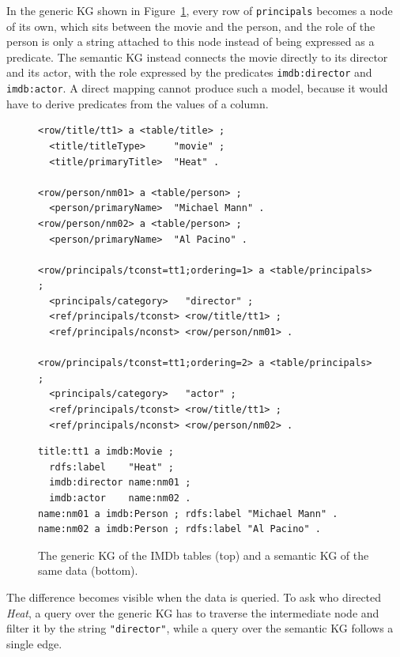 In the generic KG shown in Figure~\ref{fig:generic-imdb-eg}, every row of \texttt{principals} becomes a node of its own, which sits between the movie and the person, and the role of the person is only a string attached to this node instead of being expressed as a predicate. The semantic KG instead connects the movie directly to its director and its actor, with the role expressed by the predicates \texttt{imdb:director} and \texttt{imdb:actor}. A direct mapping cannot produce such a model, because it would have to derive predicates from the values of a column.
\begin{figure}[!htbp]
  \begin{minipage}{0.95\textwidth}
\begin{lstlisting}[language=Turtle, basicstyle=\ttfamily\scriptsize, columns=fixed, xleftmargin=0pt]
<row/title/tt1> a <table/title> ;
  <title/titleType>     "movie" ;
  <title/primaryTitle>  "Heat" .

<row/person/nm01> a <table/person> ;
  <person/primaryName>  "Michael Mann" .
<row/person/nm02> a <table/person> ;
  <person/primaryName>  "Al Pacino" .

<row/principals/tconst=tt1;ordering=1> a <table/principals> ;
  <principals/category>   "director" ;
  <ref/principals/tconst> <row/title/tt1> ;
  <ref/principals/nconst> <row/person/nm01> .

<row/principals/tconst=tt1;ordering=2> a <table/principals> ;
  <principals/category>   "actor" ;
  <ref/principals/tconst> <row/title/tt1> ;
  <ref/principals/nconst> <row/person/nm02> .

\end{lstlisting}

  \vspace{0.3em
  }
\begin{lstlisting}[language=Turtle, basicstyle=\ttfamily\scriptsize, columns=fixed, xleftmargin=0pt]
title:tt1 a imdb:Movie ;
  rdfs:label    "Heat" ;
  imdb:director name:nm01 ;
  imdb:actor    name:nm02 .
name:nm01 a imdb:Person ; rdfs:label "Michael Mann" .
name:nm02 a imdb:Person ; rdfs:label "Al Pacino" .
\end{lstlisting}
  \end{minipage}
  \caption{The generic KG of the IMDb tables (top) and a semantic KG of the same data (bottom).}
  \label{fig:generic-imdb-eg}
\end{figure}

The difference becomes visible when the data is queried. To ask who directed \emph{Heat}, a query over the generic KG has to traverse the intermediate node and filter it by the string \texttt{"director"}, while a query over the semantic KG follows a single edge.

